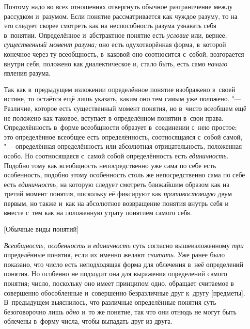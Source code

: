 Поэтому надо во всех отношениях отвергнуть обычное
разграничение между рассудком и~разумом. Если понятие рассматривается как
чуждое разуму, то на это следует скорее смотреть как на неспособность
разума узнавать себя в~понятии. Определённое и~абстрактное понятие есть
{\em условие} или, вернее, {\em существенный момент
разума;} оно есть одухотворённая форма, в~которой конечное
через ту всеобщность, в~каковой оно соотносится с~собой, возгорается внутри
себя, положено как диалектическое и, стало быть, есть само
{\em начало} явления разума.

Так как в~предыдущем изложении определённое понятие изображено
в~своей истине, то остаётся ещё лишь указать, каким оно тем самым уже
положено. "--- Различие, которое есть существенный момент
понятия, но в~чисто всеобщем ещё не положено как таковое, вступает в
определённом понятии в~свои права. Определённость в~форме всеобщности
образует в~соединении с~нею простое; это определённое
всеобщее есть определённость, соотносящаяся с~собой самой, "---
определённая определённость или абсолютная отрицательность,
положенная особо. Но соотносящаяся с~самой собой определённость есть
{\em единичность}.
Подобно тому как всеобщность непосредственно уже сама по себе
есть особенность, подобно этому особенность столь же непосредственно сама
по себе есть {\em единичность,}
на которую следует смотреть ближайшим образом как на третий
момент понятия, поскольку её фиксируют как {\em противостоящую} двум
первым, но также и~как на абсолютное возвращение понятия внутрь себя и
вместе с~тем как на положенную утрату понятием самого себя.

%
{[Обычные виды понятий]}

{\em Всеобщность, особенность} и {\em единичность} суть согласно
вышеизложенному {\em три} определённые понятия, если их именно желают
{\em считать}. Уже ранее было показано, что число есть неподходящая форма для
облечения в~неё определений понятия. Но особенно не подходит она для выражения определений самого
понятия; число, поскольку оно имеет принципом одно, обращает считаемое в
совершенно обособленные и~совершенно безразличные друг к~другу [предметы].
В~предыдущем выяснилось, что различные определённые понятия суть безоговорочно
лишь {\em одно} и~то же понятие, так что они отнюдь не могут быть облечены
в~форму числа, чтобы выпадать друг из друга.

